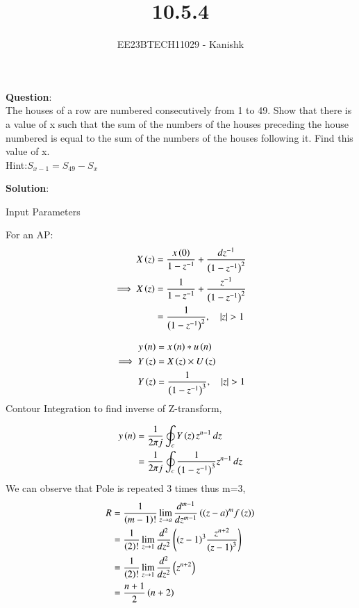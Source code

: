 \documentclass[journal,12pt,twocolumn]{IEEEtran}
\theoremstyle{remark}
\begin{document}

\vspace{3cm}

\title{10.5.4}
\author{EE23BTECH11029 - Kanishk}
\maketitle
\newpage

\bigskip

\renewcommand{\thefigure}{\theenumi}
\renewcommand{\thetable}{\theenumi}
\textbf{Question}:\\
The houses of a row are numbered consecutively from 1 to 49. Show that there is a value
of x such that the sum of the numbers of the houses preceding the house numbered is equal to the sum of the numbers of the houses following it. Find this value of x.\\
Hint:$ S_{x-1}=S_{49}-S_x$

\textbf{Solution}:\\

\begin{table}[ht]
    \centering
    \def\arraystretch{1.5}
    
   \caption{Input Parameters}
   \label{tab:10.5.4}
\end{table}


For an AP:
\begin{align}
X\left(z\right)&=\frac{x\left(0\right)}{1-z^{-1}}+ \frac{dz^{-1}}{\left(1-z^{-1}\right)^{2}}\\
\implies X\left(z\right)&=\frac{1}{1-z^{-1}}+ \frac{z^{-1}}{\left(1-z^{-1}\right)^{2}}\\
&=\frac{1}{\left(1-z^{-1}\right)^{2}},\quad \left\vert z\right\vert > 1
\end{align}

\begin{align}
y\left(n\right)&=x\left(n\right)*u\left(n\right)\\
\implies Y\left(z\right)&=X\left(z\right)\times U\left(z\right)\\
Y\left(z\right)&= \frac{1}{\left(1-z^{-1}\right)^{3}},\quad \left\vert z\right\vert>1
\end{align}
Contour Integration to find inverse of Z-transform,

\begin{align}
y\left(n\right)&=\frac{1}{2\pi j}\oint_c Y\left(z\right)z^{n-1} \,dz\\
&=\frac{1}{2\pi j} \oint_c \frac{1}{\left(1-z^{-1}\right)^{3}}z^{n-1} \,dz
\end{align}
We can observe that Pole is repeated 3 times thus m=3,
\begin{align}
R&=\frac{1}{\left(m-1\right)!}\lim\limits_{z\to a}\frac{d^{m-1}}{dz^{m-1}}\left({(z-a)}^{m}f\left(z\right)\right)  \\
&=\frac{1}{\left(2\right)!}\lim\limits_{z\to 1}\frac{d^{2}}{dz^{2}}\left({(z-1)}^{3}\frac{z^{n+2}}{{(z-1)}^3}\right)\\
&=\frac{1}{\left(2\right)!}\lim\limits_{z\to 1}\frac{d^{2}}{dz^{2}}\left(z^{n+2}\right)\\
&=\frac{n+1}{2}\left(n+2\right)
\end{align}
\end{document}
